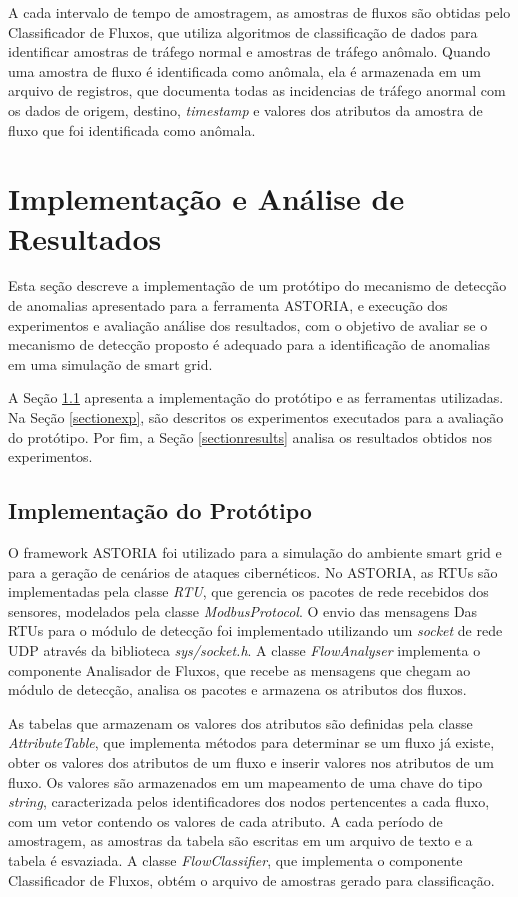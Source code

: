 \documentclass[12pt]{article}
\begin{document}
A cada intervalo de tempo de amostragem, as amostras de fluxos são obtidas pelo Classificador de Fluxos, que utiliza algoritmos de classificação de dados para identificar amostras de tráfego normal e amostras de tráfego anômalo. Quando uma amostra de fluxo é identificada como anômala, ela é armazenada em um arquivo de registros, que documenta todas as incidencias de tráfego anormal com os dados de origem, destino, \emph{timestamp} e valores dos atributos da amostra de fluxo que foi identificada como anômala.

\section{Implementação e Análise de Resultados}
\label{secimpl}
Esta seção descreve a implementação de um protótipo do mecanismo de detecção de anomalias apresentado para a ferramenta ASTORIA, e execução dos experimentos e avaliação análise dos resultados, com o objetivo de avaliar se o mecanismo de detecção proposto é adequado para a identificação de anomalias em uma simulação de smart grid.

A Seção \ref{prototype} apresenta a implementação do protótipo e as ferramentas utilizadas. Na Seção \ref{sectionexp}, são descritos os experimentos executados para a avaliação do protótipo. Por fim, a Seção \ref{sectionresults} analisa os resultados obtidos nos experimentos.

\subsection{Implementação do Protótipo}
\label{prototype}
O framework ASTORIA foi utilizado para a simulação do ambiente smart grid e para a geração de cenários de ataques cibernéticos. No ASTORIA, as RTUs são implementadas pela classe \emph{RTU}, que gerencia os pacotes de rede recebidos dos sensores, modelados pela classe \emph{ModbusProtocol}. O envio das mensagens Das RTUs para o módulo de detecção foi implementado utilizando um \emph{socket} de rede UDP através da biblioteca \emph{sys/socket.h}. A classe \emph{FlowAnalyser} implementa o componente Analisador de Fluxos, que recebe as mensagens que chegam ao módulo de detecção, analisa os pacotes e armazena os atributos dos fluxos.

As tabelas que armazenam os valores dos atributos são definidas pela classe \emph{AttributeTable}, que implementa métodos para determinar se um fluxo já existe, obter os valores dos atributos de um fluxo e inserir valores nos atributos de um fluxo. Os valores são armazenados em um mapeamento de uma chave do tipo \emph{string}, caracterizada pelos identificadores dos nodos pertencentes a cada fluxo, com um vetor contendo os valores de cada atributo. A cada período de amostragem, as amostras da tabela são escritas em um arquivo de texto e a tabela é esvaziada. A classe \emph{FlowClassifier}, que implementa o componente Classificador de Fluxos, obtém o arquivo de amostras gerado para classificação.
\end{document}
